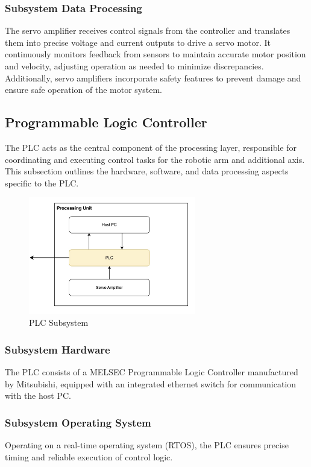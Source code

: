 \subsubsection{Subsystem Data Processing}
The servo amplifier receives control signals from the controller and translates them into precise voltage and current outputs to drive a servo motor. It continuously monitors feedback from sensors to maintain accurate motor position and velocity, adjusting operation as needed to minimize discrepancies. Additionally, servo amplifiers incorporate safety features to prevent damage and ensure safe operation of the motor system.


\subsection{Programmable Logic Controller}
The PLC acts as the central component of the processing layer, responsible for coordinating and executing control tasks for the robotic arm and additional axis. This subsection outlines the hardware, software, and data processing aspects specific to the PLC.
\begin{figure}[h!]
	\centering
 	\includegraphics[width=0.65\textwidth]{images/PLC.jpg}
 \caption{PLC Subsystem}
\end{figure}

\subsubsection{Subsystem Hardware}
The PLC consists of a MELSEC Programmable Logic Controller manufactured by Mitsubishi, equipped with an integrated ethernet switch for communication with the host PC.

\subsubsection{Subsystem Operating System}
Operating on a real-time operating system (RTOS), the PLC ensures precise timing and reliable execution of control logic.

